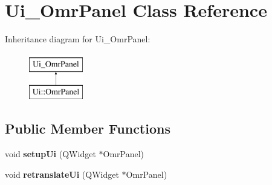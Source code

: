 \hypertarget{class_ui___omr_panel}{}\section{Ui\+\_\+\+Omr\+Panel Class Reference}
\label{class_ui___omr_panel}
Inheritance diagram for Ui\+\_\+\+Omr\+Panel\+:\begin{figure}[H]
\begin{center}
\leavevmode
\includegraphics[height=2.000000cm]{class_ui___omr_panel}
\end{center}
\end{figure}
\subsection*{Public Member Functions}
\begin{DoxyCompactItemize}
\item 
\mbox{\label{class_ui___omr_panel_ae85c6b7f656ebe4fb8f850e295b6553b}} 
void {\bfseries setup\+Ui} (Q\+Widget $\ast$Omr\+Panel)
\item 
\mbox{\label{class_ui___omr_panel_adc26850b120af05db64ba96830eb8995}} 
void {\bfseries retranslate\+Ui} (Q\+Widget $\ast$Omr\+Panel)
\end{DoxyCompactItemize}
